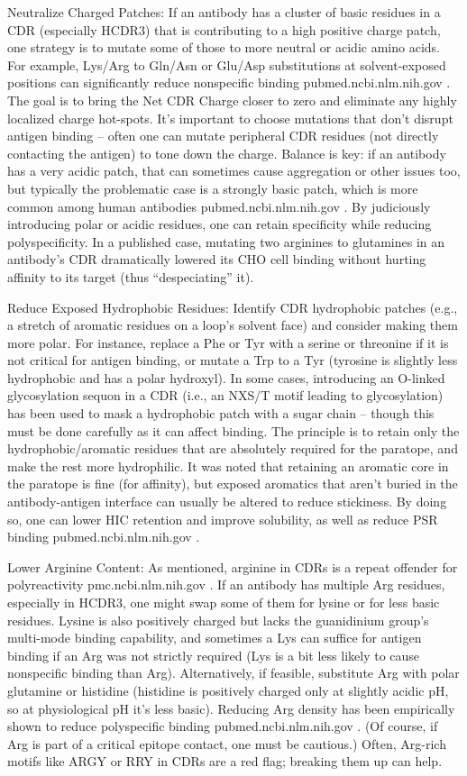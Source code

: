 Neutralize Charged Patches: If an antibody has a cluster of basic residues in a CDR (especially HCDR3) that is contributing to a high positive charge patch, one strategy is to mutate some of those to more neutral or acidic amino acids. For example, Lys/Arg to Gln/Asn or Glu/Asp substitutions at solvent-exposed positions can significantly reduce nonspecific binding
pubmed.ncbi.nlm.nih.gov
. The goal is to bring the Net CDR Charge closer to zero and eliminate any highly localized charge hot-spots. It’s important to choose mutations that don’t disrupt antigen binding – often one can mutate peripheral CDR residues (not directly contacting the antigen) to tone down the charge. Balance is key: if an antibody has a very acidic patch, that can sometimes cause aggregation or other issues too, but typically the problematic case is a strongly basic patch, which is more common among human antibodies
pubmed.ncbi.nlm.nih.gov
. By judiciously introducing polar or acidic residues, one can retain specificity while reducing polyspecificity. In a published case, mutating two arginines to glutamines in an antibody’s CDR dramatically lowered its CHO cell binding without hurting affinity to its target (thus “despeciating” it).

Reduce Exposed Hydrophobic Residues: Identify CDR hydrophobic patches (e.g., a stretch of aromatic residues on a loop’s solvent face) and consider making them more polar. For instance, replace a Phe or Tyr with a serine or threonine if it is not critical for antigen binding, or mutate a Trp to a Tyr (tyrosine is slightly less hydrophobic and has a polar hydroxyl). In some cases, introducing an O-linked glycosylation sequon in a CDR (i.e., an NXS/T motif leading to glycosylation) has been used to mask a hydrophobic patch with a sugar chain – though this must be done carefully as it can affect binding. The principle is to retain only the hydrophobic/aromatic residues that are absolutely required for the paratope, and make the rest more hydrophilic. It was noted that retaining an aromatic core in the paratope is fine (for affinity), but exposed aromatics that aren’t buried in the antibody-antigen interface can usually be altered to reduce stickiness. By doing so, one can lower HIC retention and improve solubility, as well as reduce PSR binding
pubmed.ncbi.nlm.nih.gov
.

Lower Arginine Content: As mentioned, arginine in CDRs is a repeat offender for polyreactivity
pmc.ncbi.nlm.nih.gov
. If an antibody has multiple Arg residues, especially in HCDR3, one might swap some of them for lysine or for less basic residues. Lysine is also positively charged but lacks the guanidinium group’s multi-mode binding capability, and sometimes a Lys can suffice for antigen binding if an Arg was not strictly required (Lys is a bit less likely to cause nonspecific binding than Arg). Alternatively, if feasible, substitute Arg with polar glutamine or histidine (histidine is positively charged only at slightly acidic pH, so at physiological pH it’s less basic). Reducing Arg density has been empirically shown to reduce polyspecific binding
pubmed.ncbi.nlm.nih.gov
. (Of course, if Arg is part of a critical epitope contact, one must be cautious.) Often, Arg-rich motifs like ARGY or RRY in CDRs are a red flag; breaking them up can help.

